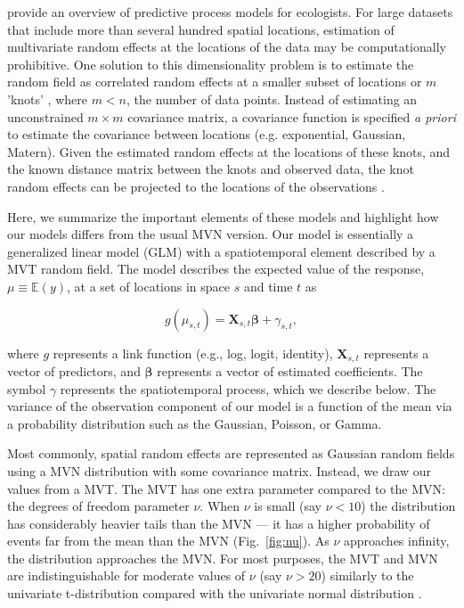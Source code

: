\documentclass[12pt,english]{article}
\begin{document}
\begin{spacing}{1.3}
\citet{latimer2009} provide an overview of predictive process models for
ecologists. For large datasets that include more than several hundred spatial
locations, estimation of multivariate random effects at the locations of the
data may be computationally prohibitive. One solution to this dimensionality
problem is to estimate the random field as correlated random effects at a
smaller subset of locations or $m$ 'knots' \citep[e.g.][]{latimer2009,
  shelton2014}, where $m < n$, the number of data points. Instead of
estimating an unconstrained $m \times m$ covariance matrix, a covariance
function is specified \emph{a priori} to estimate the covariance between
locations (e.g. exponential, Gaussian, Matern). Given the estimated random
effects at the locations of these knots, and the known distance matrix between
the knots and observed data, the knot random effects can be projected to the
locations of the observations \citep[][Figure~\ref{fig:didactic}]{latimer2009,
  finley2009}.

Here, we summarize the important elements of these models and highlight how
our models differs from the usual MVN version. Our model is essentially a
generalized linear model (GLM) with a spatiotemporal element described by a
MVT random field. The model describes the expected value of the response, $\mu
\equiv \mathbb{E}(y)$, at a set of locations in space $s$ and time $t$ as

\begin{equation}
  g(\mu_{s,t}) = \bm{X}_{s,t} \bm{\beta} + \gamma_{s,t},
\end{equation}

\noindent where $g$ represents a link function (e.g., log, logit, identity),
$\bm{X}_{s,t}$ represents a vector of predictors, and $\bm{\beta}$ represents a
vector of estimated coefficients.
The symbol $\gamma$ represents the spatiotemporal process,
which we describe below.
The variance of the observation component of
our model is a function of the mean via a
probability distribution such as the Gaussian, Poisson, or Gamma.

Most commonly, spatial random effects are represented as Gaussian random
fields using a MVN distribution with some covariance matrix. Instead, we draw
our values from a MVT. The MVT has one extra parameter compared to the MVN:
the degrees of freedom parameter $\nu$. When $\nu$ is small (say $\nu < 10$)
the distribution has considerably heavier tails than the MVN --- it has a
higher probability of events far from the mean than the MVN
(Fig.~\ref{fig:nu}). As $\nu$ approaches infinity, the distribution approaches
the MVN. For most purposes, the MVT and MVN are indistinguishable for moderate
values of $\nu$ (say $\nu > 20$) similarly to the univariate t-distribution
compared with the univariate normal distribution
\citep[e.g.][]{anderson2017}.


\end{spacing}
\end{document}
